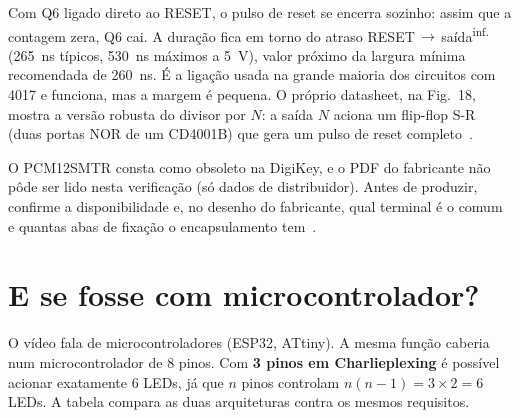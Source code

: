\documentclass[11pt,a4paper]{article}
\newcommand{\inferido}{\textsuperscript{\textcolor{douradoEsc}{\sffamily inf.}}}
\begin{document}
\begin{achado}
Com Q6 ligado direto ao RESET, o pulso de reset se encerra sozinho: assim que a contagem
zera, Q6 cai. A duração fica em torno do atraso RESET\,$\to$\,saída\inferido{}
(\SI{265}{\nano\second} típicos, \SI{530}{\nano\second} máximos a \SI{5}{\volt}), valor
próximo da largura mínima recomendada de \SI{260}{\nano\second}. É a ligação usada na grande maioria dos
circuitos com 4017 e funciona, mas a margem é pequena. O próprio datasheet, na Fig.~18,
mostra a versão robusta do divisor por $N$: a saída $N$ aciona um flip-flop S-R (duas portas
NOR de um CD4001B) que gera um pulso de reset completo~\cite{cd4017}.
\end{achado}

\begin{achado}
O PCM12SMTR consta como obsoleto na DigiKey, e o PDF do fabricante não pôde ser lido nesta
verificação (só dados de distribuidor). Antes de produzir, confirme a disponibilidade e,
no desenho do fabricante, qual terminal é o comum e quantas abas de fixação o
encapsulamento tem~\cite{pcm12}.
\end{achado}

\section{E se fosse com microcontrolador?}

O vídeo fala de microcontroladores (ESP32, ATtiny). A mesma função caberia num
microcontrolador de 8 pinos. Com \textbf{3 pinos em Charlieplexing} é possível acionar
exatamente 6 LEDs, já que $n$ pinos controlam $n(n-1) = 3 \times 2 = 6$ LEDs. A tabela
compara as duas arquiteturas contra os mesmos requisitos.
\end{document}

